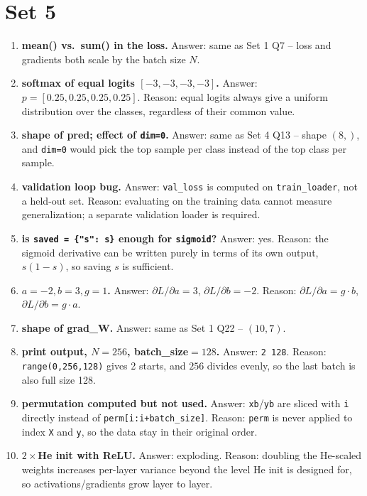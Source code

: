 \documentclass[11pt]{article}
\begin{document}
\section*{Set 5}
\begin{enumerate}

\item \textbf{mean() vs.\ sum() in the loss.}
Answer: same as Set 1 Q7 -- loss and gradients both scale by the batch
size $N$.

\item \textbf{softmax of equal logits $[-3,-3,-3,-3]$.}
Answer: $p=[0.25,0.25,0.25,0.25]$.
Reason: equal logits always give a uniform distribution over the classes,
regardless of their common value.

\item \textbf{shape of pred; effect of \texttt{dim=0}.}
Answer: same as Set 4 Q13 -- shape $(8,)$, and \texttt{dim=0} would pick
the top sample per class instead of the top class per sample.

\item \textbf{validation loop bug.}
Answer: \texttt{val\_loss} is computed on \texttt{train\_loader}, not a
held-out set.
Reason: evaluating on the training data cannot measure generalization; a
separate validation loader is required.

\item \textbf{is \texttt{saved = \{"s": s\}} enough for
\texttt{sigmoid}?}
Answer: yes.
Reason: the sigmoid derivative can be written purely in terms of its own
output, $s(1-s)$, so saving $s$ is sufficient.

\item \textbf{$a=-2,b=3,g=1$.}
Answer: $\partial L/\partial a = 3$, $\partial L/\partial b = -2$.
Reason: $\partial L/\partial a = g\cdot b$, $\partial L/\partial b = g\cdot
a$.

\item \textbf{shape of grad\_W.}
Answer: same as Set 1 Q22 -- $(10,7)$.

\item \textbf{print output, $N=256$, batch\_size$=128$.}
Answer: \texttt{2 128}.
Reason: \texttt{range(0,256,128)} gives 2 starts, and $256$ divides evenly,
so the last batch is also full size 128.

\item \textbf{permutation computed but not used.}
Answer: \texttt{xb}/\texttt{yb} are sliced with \texttt{i} directly instead
of \texttt{perm[i:i+batch\_size]}.
Reason: \texttt{perm} is never applied to index \texttt{X} and \texttt{y},
so the data stay in their original order.

\item \textbf{$2\times$He init with ReLU.}
Answer: exploding.
Reason: doubling the He-scaled weights increases per-layer variance beyond
the level He init is designed for, so activations/gradients grow layer to
layer.

\end{enumerate}
\end{document}
